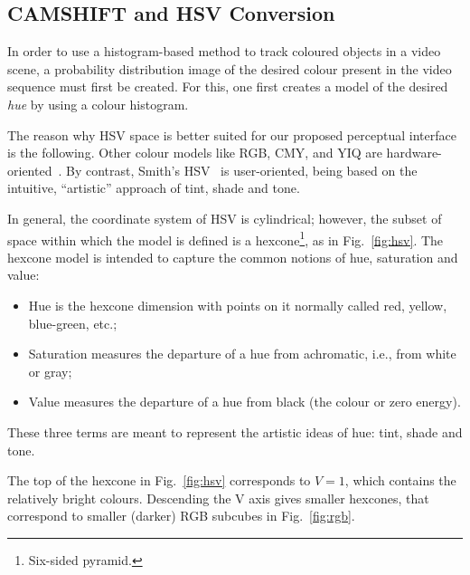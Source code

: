 
\subsection{\acs{CAMSHIFT} and \acs{HSV} Conversion}

In order to use a histogram-based method to track coloured objects in a video scene, a probability distribution image of the desired colour present in the video sequence must first be created. For this, one first creates a model of the desired \emph{hue} by using a colour histogram.

The reason why \ac{HSV} space is better suited for our proposed perceptual interface is the following. Other colour models like \ac{RGB}, \ac{CMY}, and YIQ are hardware-oriented~\cite[p.~590]{foley}. By contrast, Smith's \ac{HSV}~\cite{smith:1978} is user-oriented, being based on the intuitive, ``artistic'' approach of tint, shade and tone.

In general, the coordinate system of \ac{HSV} is cylindrical; however, the subset of space within which the model is defined is a hexcone\footnote{Six-sided pyramid.}, as in Fig.~\ref{fig:hsv}. The hexcone model is intended to capture the common notions of hue, saturation and value:
\begin{itemize}
\item Hue is the hexcone dimension with points on it normally called red, yellow, blue-green, etc.;

\item Saturation measures the departure of a hue from achromatic, i.e., from white or gray;

\item Value measures the departure of a hue from black (the colour or zero energy).
\end{itemize}
These three terms are meant to represent the artistic ideas of hue: tint, shade and tone.

The top of the hexcone in Fig.~\ref{fig:hsv} corresponds to $V = 1$, which contains the relatively bright colours. Descending the V axis gives smaller hexcones, that correspond to smaller (darker) \ac{RGB} subcubes in Fig.~\ref{fig:rgb}.


